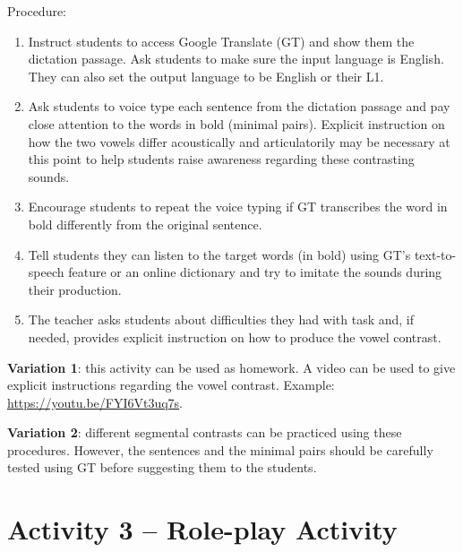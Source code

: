 \documentclass[english]{textolivre}
\begin{document}
\vspace{3ex}
Procedure:
\begin{enumerate}
\item Instruct students to access Google Translate (GT) and show them the dictation passage. Ask students to make sure the input language is English. They can also set the output language to be English or their L1.
\item Ask students to voice type each sentence from the dictation passage and pay close attention to the words in bold (minimal pairs). Explicit instruction on how the two vowels differ acoustically and articulatorily may be necessary at this point to help students raise awareness regarding these contrasting sounds.
\item Encourage students to repeat the voice typing if GT transcribes the word in bold differently from the original sentence. 
\item Tell students they can listen to the target words (in bold) using GT’s text-to-speech feature or an online dictionary and try to imitate the sounds during their production.
\item The teacher asks students about difficulties they had with task and, if needed, provides explicit instruction on how to produce the vowel contrast.
\end{enumerate}

\begin{description}
    \item \textbf{Variation 1}: this activity can be used as homework. A video can be used to give explicit instructions regarding the vowel contrast. Example: \url{https://youtu.be/FYI6Vt3uq7s}.
    \item \textbf{Variation 2}: different segmental contrasts can be practiced using these procedures. However, the sentences and the minimal pairs should be carefully tested using GT before suggesting them to the students.
\end{description}





\section{Activity 3 – Role-play Activity}\label{apdx3}
\end{document}
